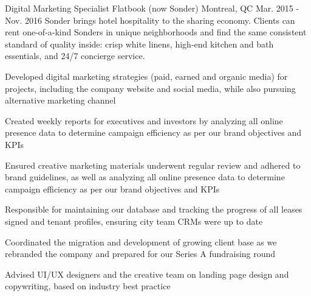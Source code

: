 \begin{cventries}
  \cventry
    {Digital Marketing Specialist} %
    {Flatbook (now Sonder)} %
    {Montreal, QC} %
    {Mar. 2015 - Nov. 2016} %
    {Sonder brings hotel hospitality to the sharing economy. Clients can rent one-of-a-kind Sonders in unique neighborhoods and find the same consistent standard of quality inside: crisp white linens, high-end kitchen and bath essentials, and 24/7 concierge service.}
    {
      \begin{cvitems} %
        \item {Developed digital marketing strategies (paid, earned and organic media) for projects, including the company website and social media, while also pursuing alternative marketing channel}
        \item {Created weekly reports for executives and investors by analyzing all online presence data to determine campaign efficiency as per our brand objectives and KPIs}
        \item {Ensured creative marketing materials underwent regular review and adhered to brand guidelines, as well as analyzing all online presence data to determine campaign efficiency as per our brand objectives and KPIs}
        \item {Responsible for maintaining our database and tracking the progress of all leases signed and tenant profiles, ensuring city team CRMs were up to date}
        \item {Coordinated the migration and development of growing client base as we rebranded the company and prepared for our Series A fundraising round}
        \item {Advised UI/UX designers and the creative team on landing page design and copywriting, based on industry best practice}
      \end{cvitems}
    }


\end{cventries}
